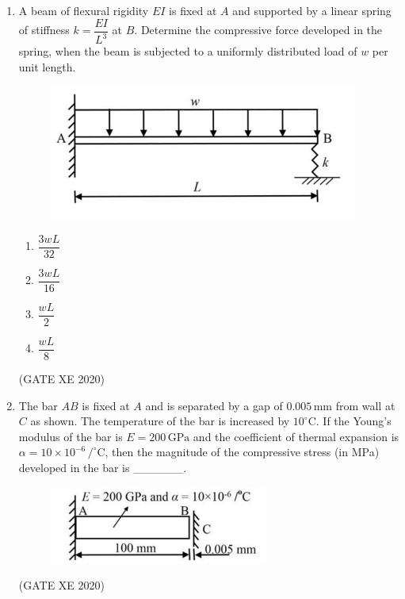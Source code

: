 \documentclass[12pt]{article}
\begin{document}
\begin{enumerate}
\begin{enumerate}
\item $\sqrt{\dfrac{k}{4M+m}}$
\item $\sqrt{\dfrac{k}{2(M+2m)}}$
\item $\sqrt{\dfrac{3k}{3M+m}}$
\item $\sqrt{\dfrac{3k}{4(3M+m)}}$
\end{enumerate}
(GATE XE 2020)

\item A beam of flexural rigidity $EI$ is fixed at $A$ and supported by a linear spring of stiffness $k=\dfrac{EI}{L^{3}}$ at $B$. Determine the compressive force developed in the spring, when the beam is subjected to a uniformly distributed load of $w$ per unit length.  

\begin{figure}[H]
    \centering
    \includegraphics[width=0.5\columnwidth]{figs/ass4_d_q14.png}
    \caption{}
    \label{fig:placeholder}
\end{figure}


\begin{enumerate}
\item $\dfrac{3wL}{32}$
\item $\dfrac{3wL}{16}$
\item $\dfrac{wL}{2}$
\item $\dfrac{wL}{8}$
\end{enumerate}
(GATE XE 2020)

\item The bar $AB$ is fixed at $A$ and is separated by a gap of $0.005 \,\text{mm}$ from wall at $C$ as shown. The temperature of the bar is increased by $10^{\circ}\text{C}$. If the Young’s modulus of the bar is $E=200 \,\text{GPa}$ and the coefficient of thermal expansion is $\alpha = 10 \times 10^{-6}\, /^\circ \text{C}$, then the magnitude of the compressive stress (in MPa) developed in the bar is \_\_\_\_\_\_.

\begin{figure}[H]
    \centering
    \includegraphics[width=0.5\columnwidth]{figs/ass4_d_q15.png}
    \caption{}
    \label{fig:placeholder}
\end{figure}
(GATE XE 2020)


\end{enumerate}
\end{document}
